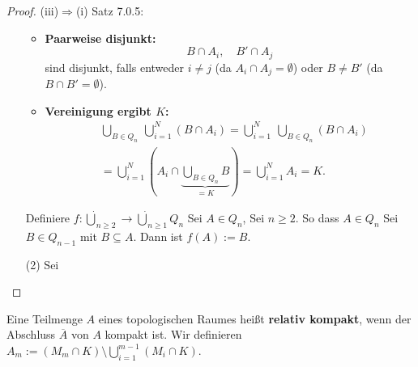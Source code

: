 \begin{proof}{(iii)$\Rightarrow$(i) Satz 7.0.5:}
\begin{itemize}
{\begin{itemize}
    \item \textbf{Paarweise disjunkt:}
    $$
        B \cap A_i,\quad B' \cap A_j
    $$
    sind disjunkt, falls entweder $i \neq j$ (da $A_i \cap A_j = \emptyset$) 
    oder $B \neq B'$ (da $B \cap B' = \emptyset$).
    
    \item \textbf{Vereinigung ergibt $K$:}
    \begin{equation*}
    \begin{split}
        &\bigcup_{B \in Q_n} \ \bigcup_{i=1}^N (B \cap A_i) 
        = \bigcup_{i=1}^N \ \bigcup_{B \in Q_n} (B \cap A_i) \\
        &= \bigcup_{i=1}^N ( A_i \cap \underbrace{\bigcup_{B \in Q_n} B}_{=K} ) 
        = \bigcup_{i=1}^N A_i = K.
    \end{split}
    \end{equation*}
\end{itemize}
}
Definiere $f: \dot{\bigcup}_{n\geq 2} \to \dot{\bigcup}_{n \geq 1}Q_n$
Sei $A \in Q_n$, Sei $n\geq 2$. So dass $A \in Q_n$ Sei $B \in Q_{n-1}$ mit $B \subseteq A$. 
Dann ist $f(A) := B$.
\item[(2)] Sei 
\end{itemize}

\end{proof}

{
    Eine Teilmenge $A$ eines topologischen Raumes heißt \textbf{relativ kompakt},
    wenn der Abschluss $\overline{A}$ von $A$ kompakt ist.
    Wir definieren $A_m := (M_m \cap K) \setminus \bigcup_{i=1}^{m-1} (M_i \cap K)$.
}